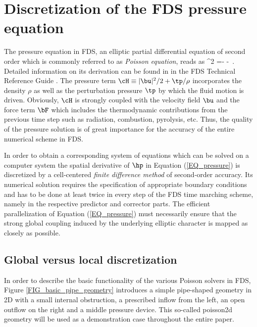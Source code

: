 \section{Discretization of the FDS pressure equation}
\label{SEC_discretization}
The pressure equation in FDS, an elliptic partial differential equation of second order which is commonly referred to as {\it Poisson equation}, reads as
\be 
  \nabla^2 \cH =- - \nabla \cdot \bF\,.
  \label{EQ_pressure}
\ee
%
Detailed information on its derivation can be found in in the FDS Technical Reference Guide \cite{McGrattan:2018:TG}.
The pressure term $\cH \equiv |\bu|^2/2 + \tp/\rho$  incorporates the density $\rho$ as well as the perturbation pressure $\tp$ by which the fluid motion is driven. Obviously, $\cH$ is strongly coupled with the velocity field
$\bu$ and the force term $\bF$ which includes the thermodynamic contributions from the previous time step such as radiation, combustion, pyrolysis, etc. Thus, 
the quality of the pressure solution is of great importance for the accuracy of the entire numerical scheme in FDS.

In order to obtain a corresponding system of equations which can be solved on a computer system the
spatial derivative of $\hp$  in Equation (\ref{EQ_pressure})  is discretized by a cell-centered {\it finite difference method} of second-order accuracy. Its numerical solution requires the specification of appropriate boundary conditions and has to be done at least twice in every step of the FDS time marching scheme, namely in the respective predictor and corrector parts.
%
The efficient parallelization of Equation (\ref{EQ_pressure}) must necessarily ensure that the strong global coupling induced by the underlying elliptic character is mapped as closely as possible.

\subsection{Global versus local discretization}

\label{SEC_poisson}

In order to describe the basic functionality of the various Poisson solvers in FDS,
Figure \ref{FIG_basic_pipe_geometry} introduces a simple pipe-shaped geometry in 2D with a small internal obstruction, a prescribed inflow from the left, an open outflow on the right and a middle pressure device. This so-called {\ct poisson2d} geometry will be used as a  demonstration case throughout the entire paper. 

